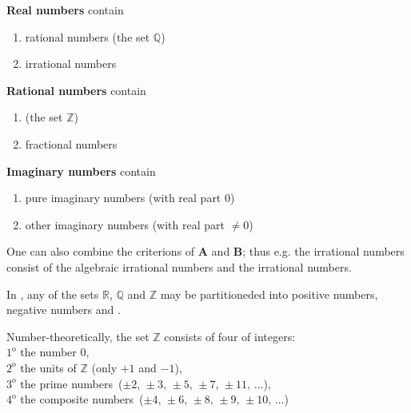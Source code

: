 \documentclass[12pt]{article}
\theoremstyle{definition}
\begin{document}
\textbf{Real numbers} contain
\begin{enumerate}
\item rational numbers (the set $\mathbb{Q}$)
\item irrational numbers
\end{enumerate}

\textbf{Rational numbers} contain
\begin{enumerate}
\item {} (the set $\mathbb{Z}$)
\item fractional numbers
\end{enumerate}

\textbf{Imaginary numbers} contain
\begin{enumerate}
\item pure imaginary numbers (with real part 0)
\item other imaginary numbers (with real part $\neq 0$)
\end{enumerate}

$$ $$ 
One can also combine the criterions of \textbf{A} and \textbf{B}; thus e.g. 
the irrational numbers consist of the algebraic irrational numbers and 
the  irrational numbers.

In , any of the sets $\mathbb{R}$, 
$\mathbb{Q}$ and $\mathbb{Z}$ may be partitioneded into positive numbers, negative numbers and .

Number-theoretically, the set $\mathbb{Z}$ consists of four  of integers:\\
$1^\mathrm{o}$\; the number 0,\\
$2^\mathrm{o}$\; the units of $\mathbb{Z}$ (only $+1$ and $-1$),\\
$3^\mathrm{o}$\; the prime numbers\, ($\pm2,\,\pm3,\,\pm5,\,\pm7,\,\pm11,\,\ldots$),\\
$4^\mathrm{o}$\; the composite numbers\, ($\pm4,\,\pm6,\,\pm8,\,\pm9,\,\pm10,\,\ldots$)



\end{document}
